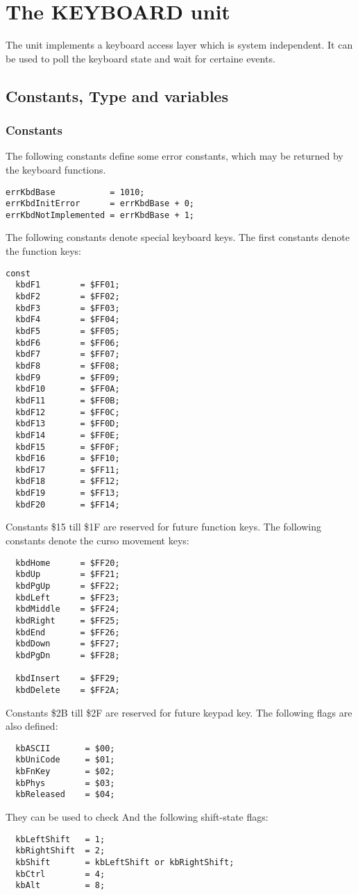 \chapter{The KEYBOARD unit}

The  unit implements a keyboard access layer which is system
independent. It can be used to poll the keyboard state and wait for certaine
events. 

\section{Constants, Type and variables }

\subsection{Constants}

The following constants define some error constants, which may be returned
by the keyboard functions.
\begin{verbatim}
errKbdBase           = 1010;
errKbdInitError      = errKbdBase + 0;
errKbdNotImplemented = errKbdBase + 1;
\end{verbatim}
The following constants denote special keyboard keys. The first constants
denote the function keys:
\begin{verbatim}
const
  kbdF1        = $FF01;
  kbdF2        = $FF02;
  kbdF3        = $FF03;
  kbdF4        = $FF04;
  kbdF5        = $FF05;
  kbdF6        = $FF06;
  kbdF7        = $FF07;
  kbdF8        = $FF08;
  kbdF9        = $FF09;
  kbdF10       = $FF0A;
  kbdF11       = $FF0B;
  kbdF12       = $FF0C;
  kbdF13       = $FF0D;
  kbdF14       = $FF0E;
  kbdF15       = $FF0F;
  kbdF16       = $FF10;
  kbdF17       = $FF11;
  kbdF18       = $FF12;
  kbdF19       = $FF13;
  kbdF20       = $FF14;
\end{verbatim}
Constants  \$15 till \$1F are reserved for future function keys. The
following constants denote the curso movement keys:
\begin{verbatim}
  kbdHome      = $FF20;
  kbdUp        = $FF21;
  kbdPgUp      = $FF22;
  kbdLeft      = $FF23;
  kbdMiddle    = $FF24;
  kbdRight     = $FF25;
  kbdEnd       = $FF26;
  kbdDown      = $FF27;
  kbdPgDn      = $FF28;

  kbdInsert    = $FF29;
  kbdDelete    = $FF2A;
\end{verbatim}
Constants \$2B till \$2F are reserved for future keypad key.
The following flags are also defined:
\begin{verbatim}
  kbASCII       = $00;
  kbUniCode     = $01;
  kbFnKey       = $02;
  kbPhys        = $03;
  kbReleased    = $04;
\end{verbatim}
They can be used to check And the following shift-state flags:
\begin{verbatim}
  kbLeftShift   = 1;
  kbRightShift  = 2;
  kbShift       = kbLeftShift or kbRightShift;
  kbCtrl        = 4;
  kbAlt         = 8;
\end{verbatim}
